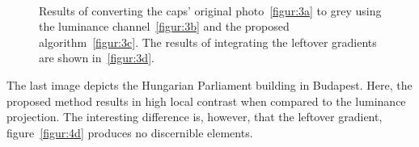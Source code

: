 \documentclass[conference]{IEEEtran}
\begin{document}
\begin{figure}[t]  
  \centering
  \\
\caption{Results of converting the caps' original photo~\ref{figur:3a} to grey using the luminance channel~\ref{figur:3b} and the proposed algorithm~\ref{figur:3c}. The results of integrating the leftover gradients are shown in~\ref{figur:3d}.}
\label{fig:3}
\end{figure}
The last image depicts the Hungarian Parliament building in Budapest. Here, the proposed method results in high local contrast when compared to the luminance projection. The interesting difference is, however, that the leftover gradient, figure~\ref{figur:4d} produces no discernible elements. 
\end{document}
